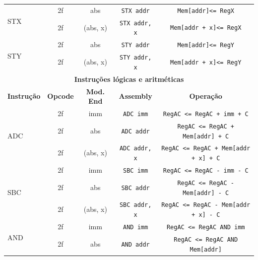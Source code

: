 \documentclass[
	12pt,				  %
	openright,		%
	a4paper,			%
	english,			%
	french,				%
	spanish,			%
	brazil,				%
]{abntex2}
\newcommand{\codenobg}[1]{\texttt{#1}}
\begin{document}
\begin{table}[htb]
\begin{tabular}{|l|c|c|c|c|}
		\multirow{2}{*}{STX} & 2f              & abs               & \codenobg{STX addr}    & \codenobg{Mem[addr]<= RegX}                   \\ \cline{2-5}
		                     & 2f              & (abs, x)          & \codenobg{STX addr, x} & \codenobg{Mem[addr + x]<= RegX}               \\ \hline
		\multirow{2}{*}{STY} & 2f              & abs               & \codenobg{STY addr}    & \codenobg{Mem[addr]<= RegY}                   \\ \cline{2-5}
		                     & 2f              & (abs, x)          & \codenobg{STY addr, x} & \codenobg{Mem[addr + x]<= RegY}               \\ \hline
		\multicolumn{5}{|c|}{\textbf{Instruções lógicas e aritméticas}}                                                                     \\ \hline
		\textbf{Instrução}   & \textbf{Opcode} & \textbf{Mod. End} & \textbf{Assembly}      & \textbf{Operação}                             \\ \hline
		\multirow{3}{*}{ADC} & 2f              & imm               & \codenobg{ADC imm}     & \codenobg{RegAC <= RegAC + imm + C}           \\ \cline{2-5}
		                     & 2f              & abs               & \codenobg{ADC addr}    & \codenobg{RegAC <= RegAC + Mem[addr] + C}     \\ \cline{2-5}
		                     & 2f              & (abs, x)          & \codenobg{ADC addr, x} & \codenobg{RegAC <= RegAC + Mem[addr + x] + C} \\ \hline
		\multirow{3}{*}{SBC} & 2f              & imm               & \codenobg{SBC imm}     & \codenobg{RegAC <= RegAC - imm - C}           \\ \cline{2-5}
		                     & 2f              & abs               & \codenobg{SBC addr}    & \codenobg{RegAC <= RegAC - Mem[addr] - C}     \\ \cline{2-5}
		                     & 2f              & (abs, x)          & \codenobg{SBC addr, x} & \codenobg{RegAC <= RegAC - Mem[addr + x] - C} \\ \hline
		\multirow{3}{*}{AND} & 2f              & imm               & \codenobg{AND imm}     & \codenobg{RegAC <= RegAC AND imm}             \\ \cline{2-5}
		                     & 2f              & abs               & \codenobg{AND addr}    & \codenobg{RegAC <= RegAC AND Mem[addr]}       \\ \cline{2-5}

\end{tabular}
\end{table}
\end{document}

